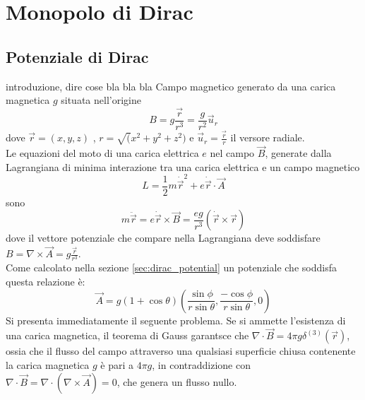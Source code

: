 \chapter{Monopolo di Dirac}
\section{Potenziale di Dirac}
%
introduzione, dire cose bla bla bla
Campo magnetico generato da una carica magnetica $g$ situata nell'origine
$$
   B = g \frac{\vec r}{r^3} = \frac{g}{r^2} \vec u _r
$$
dove $\vec r = (x,y,z)$ , $r = \sqrt (x^2 + y^2 + z^2)$ e $\vec u _r = \frac{\vec r}{r}$
il versore radiale.\\
Le equazioni del moto di una carica elettrica $e$ nel campo $\vec B$,
generate dalla Lagrangiana di minima interazione tra una carica elettrica e un campo
magnetico
$$
   L = \frac{1}{2} m \dot{\vec r} ^2 + e \dot{\vec r} \cdot \vec A
$$
sono
$$
   m \ddot{\vec r} = e\dot{\vec r} \times \vec B =
      \frac{eg}{r^3}(\dot{\vec r} \times \vec r)
$$
dove il vettore potenziale che compare nella Lagrangiana deve soddisfare
$B = \nabla \times \vec A = g \frac{\vec r}{r^3}$.\\

Come calcolato nella sezione \ref{sec:dirac_potential} un potenziale che soddisfa
questa relazione è:
$$
  \vec A = g(1 + \cos\theta)\left( \frac{\sin\phi}{r\sin\theta},
     \frac{-\cos\phi}{r\sin\theta},0 \right)
$$
Si presenta immediatamente il seguente problema. Se si ammette l'esistenza di una carica
magnetica, il teorema di Gauss garantsce che $\nabla \cdot \vec B = 4\pi g\delta^{(3)}(\vec r)$,
ossia che il flusso del campo attraverso una qualsiasi superficie chiusa contenente
la carica magnetica $g$ è pari a $4\pi g$, in contraddizione con
$\nabla \cdot \vec B = \nabla \cdot (\nabla \times \vec A) = 0$, che genera un
flusso nullo.\\

